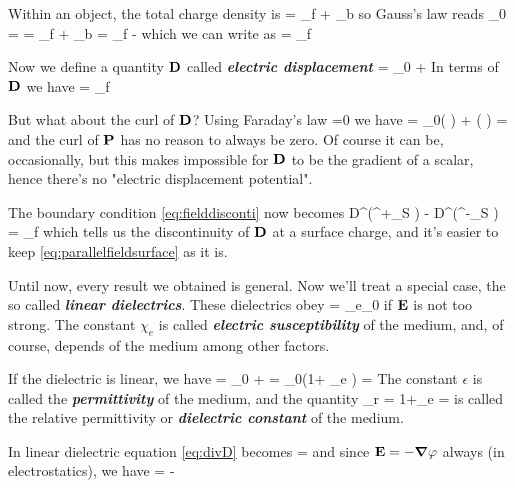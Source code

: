 \documentclass[oneside, 12pt, notitlepage]{book}
\begin{document}
Within an object, the total charge density is
\beq[] \rho = \rho_f + \rho_b \eeq
so Gauss's law reads
\beq[] \epsilon_0  = \rho = \rho_f + \rho_b = \rho_f -  \eeq
which we can write as
\beq[]  = \rho_f \eeq

Now we define a quantity \(\vb{D}\) called \textit{\textbf{electric displacement}}
\beq[]  = \epsilon_0  +  \eeq
In terms of \(\vb{D}\) we have
\beq[eq:divD]  = \rho_f \eeq

But what about the curl of \(\vb{D}\)? Using Faraday's law
\beq[] =0 \eeq
we have
\beq[]  = \epsilon_0\left( \right) + \left( \right) = \eeq
and the curl of \(\vb{P}\) has no reason to always be zero. Of course it can be, occasionally, but this makes impossible for \(\vb{D}\) to be the gradient of a scalar, hence there's no "electric displacement potential".\par

The boundary condition \eqref{eq:fielddisconti} now becomes
\beq[] D^{\perp}\left(^{+}_S \right) - D^{\perp}\left(^{-}_S \right) = \sigma_f \eeq
which tells us the discontinuity of \(\vb{D}\) at a surface charge, and it's easier to keep \eqref{eq:parallelfieldsurface} as it is.\par

Until now, every result we obtained is general. Now we'll treat a special case, the so called \textit{\textbf{linear dielectrics}}. These dielectrics obey
\beq[]  = \chi_e\epsilon_0 \eeq
if \(\vb{E}\) is not too strong. The constant \( \chi_e\) is called \textit{\textbf{electric susceptibility}} of the medium, and, of course, depends of the medium among other factors.\par

If the dielectric is linear, we have
\beq[]  = \epsilon_0 +  = \epsilon_0\left(1+ \chi_e \right) = \epsilon {} \eeq
The constant \(\epsilon\) is called the \textit{\textbf{permittivity}} of the medium, and the quantity
\beq[] \epsilon_r = 1+\chi_e =  \eeq
is called the relative permittivity or \textit{\textbf{dielectric constant}} of the medium.\par

In linear dielectric equation \eqref{eq:divD} becomes
\beq[]  =  \eeq
and since \(\vb{E} = -\grad{\varphi}\) always (in electrostatics), we have
\beq[] \laplacian{\epot} = - \eeq
\end{document}
